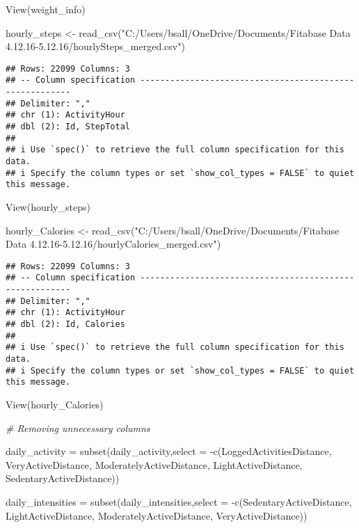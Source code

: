 \documentclass[
]{article}
\newenvironment{Shaded}{\begin{snugshade}}{\end{snugshade}}
\newcommand{\AttributeTok}[1]{\textcolor[rgb]{0.77,0.63,0.00}{#1}}
\newcommand{\CommentTok}[1]{\textcolor[rgb]{0.56,0.35,0.01}{\textit{#1}}}
\newcommand{\FunctionTok}[1]{\textcolor[rgb]{0.00,0.00,0.00}{#1}}
\newcommand{\NormalTok}[1]{#1}
\newcommand{\OtherTok}[1]{\textcolor[rgb]{0.56,0.35,0.01}{#1}}
\newcommand{\SpecialCharTok}[1]{\textcolor[rgb]{0.00,0.00,0.00}{#1}}
\newcommand{\StringTok}[1]{\textcolor[rgb]{0.31,0.60,0.02}{#1}}
\begin{document}
\begin{Shaded}
\begin{Highlighting}[]
\FunctionTok{View}\NormalTok{(weight\_info)}

\NormalTok{hourly\_steps }\OtherTok{\textless{}{-}} \FunctionTok{read\_csv}\NormalTok{(}\StringTok{"C:/Users/bsall/OneDrive/Documents/Fitabase Data 4.12.16{-}5.12.16/hourlySteps\_merged.csv"}\NormalTok{)}
\end{Highlighting}
\end{Shaded}

\begin{verbatim}
## Rows: 22099 Columns: 3
## -- Column specification --------------------------------------------------------
## Delimiter: ","
## chr (1): ActivityHour
## dbl (2): Id, StepTotal
## 
## i Use `spec()` to retrieve the full column specification for this data.
## i Specify the column types or set `show_col_types = FALSE` to quiet this message.
\end{verbatim}

\begin{Shaded}
\begin{Highlighting}[]
\FunctionTok{View}\NormalTok{(hourly\_steps)}

\NormalTok{hourly\_Calories }\OtherTok{\textless{}{-}} \FunctionTok{read\_csv}\NormalTok{(}\StringTok{"C:/Users/bsall/OneDrive/Documents/Fitabase Data 4.12.16{-}5.12.16/hourlyCalories\_merged.csv"}\NormalTok{)}
\end{Highlighting}
\end{Shaded}

\begin{verbatim}
## Rows: 22099 Columns: 3
## -- Column specification --------------------------------------------------------
## Delimiter: ","
## chr (1): ActivityHour
## dbl (2): Id, Calories
## 
## i Use `spec()` to retrieve the full column specification for this data.
## i Specify the column types or set `show_col_types = FALSE` to quiet this message.
\end{verbatim}

\begin{Shaded}
\begin{Highlighting}[]
\FunctionTok{View}\NormalTok{(hourly\_Calories)}
\end{Highlighting}
\end{Shaded}

\begin{Shaded}
\begin{Highlighting}[]
\CommentTok{\# Removing unnecessary columns}

\NormalTok{daily\_activity }\OtherTok{=} \FunctionTok{subset}\NormalTok{(daily\_activity,}\AttributeTok{select =} \SpecialCharTok{{-}}\FunctionTok{c}\NormalTok{(LoggedActivitiesDistance, VeryActiveDistance, ModeratelyActiveDistance, LightActiveDistance, SedentaryActiveDistance))}

\NormalTok{daily\_intensities }\OtherTok{=} \FunctionTok{subset}\NormalTok{(daily\_intensities,}\AttributeTok{select =} \SpecialCharTok{{-}}\FunctionTok{c}\NormalTok{(SedentaryActiveDistance, LightActiveDistance, ModeratelyActiveDistance, VeryActiveDistance))}
\end{Highlighting}
\end{Shaded}
\end{document}
